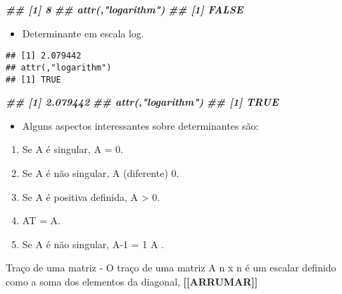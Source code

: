 \documentclass[
]{article}
\newenvironment{Shaded}{\begin{snugshade}}{\end{snugshade}}
\newcommand{\AttributeTok}[1]{\textcolor[rgb]{0.13,0.29,0.53}{#1}}
\newcommand{\ConstantTok}[1]{\textcolor[rgb]{0.56,0.35,0.01}{#1}}
\newcommand{\DocumentationTok}[1]{\textcolor[rgb]{0.56,0.35,0.01}{\textbf{\textit{#1}}}}
\newcommand{\FunctionTok}[1]{\textcolor[rgb]{0.13,0.29,0.53}{\textbf{#1}}}
\newcommand{\NormalTok}[1]{#1}
\newcommand{\SpecialCharTok}[1]{\textcolor[rgb]{0.81,0.36,0.00}{\textbf{#1}}}
\providecommand{\tightlist}{%
  \setlength{\itemsep}{0pt}\setlength{\parskip}{0pt}}
\begin{document}
\begin{Shaded}
\begin{Highlighting}[]
\DocumentationTok{\#\# [1] 8}
\DocumentationTok{\#\# attr(,"logarithm")}
\DocumentationTok{\#\# [1] FALSE}
\end{Highlighting}
\end{Shaded}

\begin{itemize}
\tightlist
\item
  Determinante em escala log.
\end{itemize}

\begin{Shaded}
\end{Shaded}

\begin{verbatim}
## [1] 2.079442
## attr(,"logarithm")
## [1] TRUE
\end{verbatim}

\begin{Shaded}
\begin{Highlighting}[]
\DocumentationTok{\#\# [1] 2.079442}
\DocumentationTok{\#\# attr(,"logarithm")}
\DocumentationTok{\#\# [1] TRUE}
\end{Highlighting}
\end{Shaded}

\begin{itemize}
\tightlist
\item
  Alguns aspectos interessantes sobre determinantes são:
\end{itemize}

\begin{enumerate}
\def\labelenumi{\arabic{enumi}.}
\tightlist
\item
  Se A é singular, \textbar A\textbar{} = 0.
\item
  Se A é não singular, \textbar A\textbar{} (diferente) 0.
\item
  Se A é positiva definida, \textbar A\textbar{} \textgreater{} 0.
\item
  \textbar AT\textbar{} = \textbar A\textbar.
\item
  Se A é não singular, \textbar A-1\textbar{} = 1 \textbar A\textbar{} .
\end{enumerate}

Traço de uma matriz - O traço de uma matriz A n x n é um escalar
definido como a soma dos elementos da diagonal,
\textbf{{[}{[}ARRUMAR{]}{]}}
\end{document}
